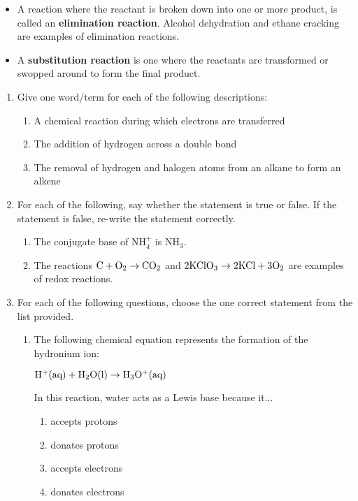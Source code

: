 \begin{itemize}
\item{A reaction where the reactant is broken down into one or more product, is called an \textbf{elimination reaction}. Alcohol dehydration and ethane cracking are examples of elimination reactions.}
\item{A \textbf{substitution reaction} is one where the reactants are transformed or swopped around to form the final product.}
\end{itemize}

\begin{eocexercises}{}
\begin{enumerate}
\item{
Give one word/term for each of the following descriptions:
	\begin{enumerate}
	\item{A chemical reaction during which electrons are transferred}
	\item{The addition of hydrogen across a double bond}
	\item{The removal of hydrogen and halogen atoms from an alkane to form an alkene}
	\end{enumerate}
}

\item{
For each of the following, say whether the statement is true or false. If the statement is false, re-write the statement correctly.
	\begin{enumerate}
	\item{The conjugate base of NH$_{4}^{+}$ is NH$_{3}$.}
	\item{The reactions $\rm{C + O_{2} \rightarrow CO_{2}}$ and $\rm{2KClO_{3} \rightarrow 2KCl + 3O_{2}}$ are examples of redox reactions.}
	\end{enumerate}
}

\item{For each of the following questions, choose the one correct statement from the list provided.}
\renewcommand{\labelenumii}{\Alph{enumii}}

	\begin{enumerate}
	\item{
The following chemical equation represents the formation of the hydronium ion:
	\begin{center}
	$\rm{H^{+} (aq) + H_{2}O (l) \rightarrow H_{3}O^{+} (aq)}$
	\end{center}

In this reaction, water acts as a Lewis base because it...
		\begin{enumerate}
		\item{accepts protons}
		\item{donates protons}
		\item{accepts electrons}
		\item{donates electrons}
		\end{enumerate}
}


\end{enumerate}
\end{enumerate}
\end{eocexercises}
